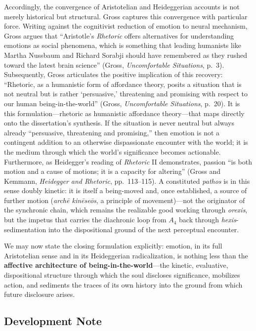 \documentclass{article}
\begin{document}
Accordingly, the convergence of Aristotelian and Heideggerian accounts is not merely historical but structural. Gross captures this convergence with particular force. Writing against the cognitivist reduction of emotion to neural mechanism, Gross argues that ``Aristotle's \textit{Rhetoric} offers alternatives for understanding emotions as social phenomena, which is something that leading humanists like Martha Nussbaum and Richard Sorabji should have remembered as they rushed toward the latest brain science'' (Gross, \textit{Uncomfortable Situations}, p.~3). Subsequently, Gross articulates the positive implication of this recovery: ``Rhetoric, as a humanistic form of affordance theory, posits a situation that is not neutral but is rather `persuasive,' threatening and promising with respect to our human being-in-the-world'' (Gross, \textit{Uncomfortable Situations}, p.~20). It is this formulation---rhetoric as humanistic affordance theory---that maps directly onto the dissertation's synthesis. If the situation is never neutral but always already ``persuasive, threatening and promising,'' then emotion is not a contingent addition to an otherwise dispassionate encounter with the world; it is the medium through which the world's significance becomes actionable. Furthermore, as Heidegger's reading of \textit{Rhetoric} II demonstrates, passion ``is both motion and a cause of motions; it is a capacity for altering'' (Gross and Kemmann, \textit{Heidegger and Rhetoric}, pp.~113--115). A constituted \textit{pathos} is in this sense doubly kinetic: it is itself a being-moved and, once established, a source of further motion (\textit{archē kinēseōs}, a principle of movement)---not the originator of the synchronic chain, which remains the realizable good working through \textit{orexis}, but the impetus that carries the diachronic loop from $A_4$ back through \textit{hexis}-sedimentation into the dispositional ground of the next perceptual encounter.

We may now state the closing formulation explicitly: emotion, in its full Aristotelian sense and in its Heideggerian radicalization, is nothing less than the \textbf{affective architecture of being-in-the-world}---the kinetic, evaluative, dispositional structure through which the soul discloses significance, mobilizes action, and sediments the traces of its own history into the ground from which future disclosure arises.


\subsection*{Development Note}
\end{document}
